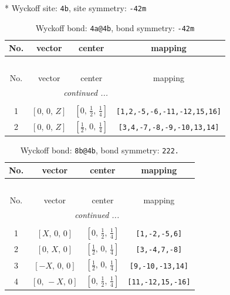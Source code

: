 \documentclass[fleqn,8pt]{jsarticle}
\begin{document}
* Wyckoff site: {\tt 4b}, site symmetry: {\tt -42m}
\renewcommand{\arraystretch}{1.2}
\begin{longtable}{cccc}
\caption{Wyckoff bond: {\tt 4a@4b}, bond symmetry: {\tt -42m}}
 \\
 \hline \hline
No. & vector & center & mapping \\ \hline \endfirsthead

\multicolumn{3}{l}{\tablename\ \thetable{}} \\
 \hline \hline
No. & vector & center & mapping \\ \hline \endhead

 \hline \hline
\multicolumn{3}{r}{\footnotesize\it continued ...} \\ \endfoot

 \hline \hline
\multicolumn{3}{r}{} \\ \endlastfoot

1 & $\left[ 0,\, 0,\, Z \right]$ & $\left[ 0,\, \frac{1}{2},\, \frac{1}{4} \right]$ & {\tt [1,2,-5,-6,-11,-12,15,16]} \\ \hline
2 & $\left[ 0,\, 0,\, Z \right]$ & $\left[ \frac{1}{2},\, 0,\, \frac{1}{4} \right]$ & {\tt [3,4,-7,-8,-9,-10,13,14]} \\
\end{longtable}
\renewcommand{\arraystretch}{1.2}
\begin{longtable}{cccc}
\caption{Wyckoff bond: {\tt 8b@4b}, bond symmetry: {\tt 222.}}
 \\
 \hline \hline
No. & vector & center & mapping \\ \hline \endfirsthead

\multicolumn{3}{l}{\tablename\ \thetable{}} \\
 \hline \hline
No. & vector & center & mapping \\ \hline \endhead

 \hline \hline
\multicolumn{3}{r}{\footnotesize\it continued ...} \\ \endfoot

 \hline \hline
\multicolumn{3}{r}{} \\ \endlastfoot

1 & $\left[ X,\, 0,\, 0 \right]$ & $\left[ 0,\, \frac{1}{2},\, \frac{1}{4} \right]$ & {\tt [1,-2,-5,6]} \\ \hline
2 & $\left[ 0,\, X,\, 0 \right]$ & $\left[ \frac{1}{2},\, 0,\, \frac{1}{4} \right]$ & {\tt [3,-4,7,-8]} \\ \hline
3 & $\left[ - X,\, 0,\, 0 \right]$ & $\left[ \frac{1}{2},\, 0,\, \frac{1}{4} \right]$ & {\tt [9,-10,-13,14]} \\ \hline
4 & $\left[ 0,\, - X,\, 0 \right]$ & $\left[ 0,\, \frac{1}{2},\, \frac{1}{4} \right]$ & {\tt [11,-12,15,-16]} \\
\end{longtable}
\end{document}

